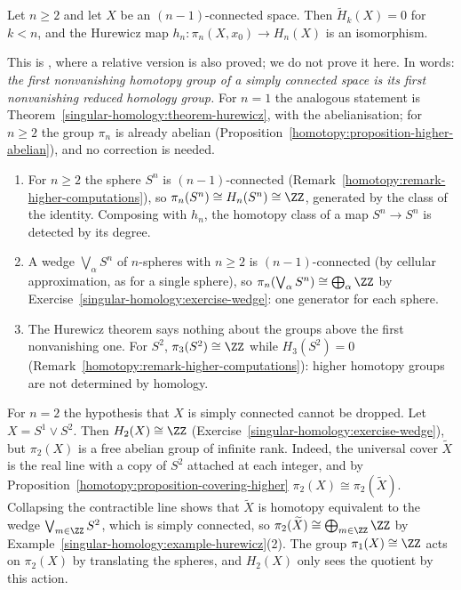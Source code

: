 \begin{theorem}[Hurewicz]\label{singular-homology:theorem-hurewicz-general}
Let $n \geq 2$ and let $X$ be an $(n-1)$-connected space. Then $\tilde{H}_k(X) = 0$ for $k < n$, and the Hurewicz map $h_n \colon \pi_n(X, x_0) \to H_n(X)$ is an isomorphism.
\end{theorem}

This is \cite[Theorem 4.32]{hatcher-at}, where a relative version is also proved; we do not prove it here. In words: \emph{the first nonvanishing homotopy group of a simply connected space
is its first nonvanishing reduced homology group.} For $n = 1$ the analogous statement is Theorem~\ref{singular-homology:theorem-hurewicz}, with the abelianisation; for $n \geq 2$ the group
$\pi_n$ is already abelian (Proposition~\ref{homotopy:proposition-higher-abelian}), and no correction is needed.

\begin{example}\label{singular-homology:example-hurewicz}
\begin{enumerate}
\item For $n \geq 2$ the sphere $S^n$ is $(n-1)$-connected (Remark~\ref{homotopy:remark-higher-computations}), so $\pi_n(S^n) \cong H_n(S^n) \cong \ZZ$, generated by the class of the
identity. Composing with $h_n$, the homotopy class of a map $S^n \to S^n$ is detected by its degree.
\item A wedge $\bigvee_{\alpha}S^n$ of $n$-spheres with $n \geq 2$ is $(n-1)$-connected (by cellular approximation, as for a single sphere), so
$\pi_n(\bigvee_\alpha S^n) \cong \bigoplus_\alpha\ZZ$ by Exercise~\ref{singular-homology:exercise-wedge}: one generator for each sphere.
\item The Hurewicz theorem says nothing about the groups above the first nonvanishing one. For $S^2$, $\pi_3(S^2) \cong \ZZ$ while $H_3(S^2) = 0$
(Remark~\ref{homotopy:remark-higher-computations}): higher homotopy groups are not determined by homology.
\end{enumerate}
\end{example}

\begin{counterexample}\label{singular-homology:counterexample-hurewicz-simply-connected}
For $n = 2$ the hypothesis that $X$ is simply connected cannot be dropped. Let $X = S^1 \vee S^2$. Then $H_2(X) \cong \ZZ$ (Exercise~\ref{singular-homology:exercise-wedge}), but $\pi_2(X)$ is a
free abelian group of infinite rank. Indeed, the universal cover $\widetilde{X}$ is the real line with a copy of $S^2$ attached at each integer, and by
Proposition~\ref{homotopy:proposition-covering-higher} $\pi_2(X) \cong \pi_2(\widetilde{X})$. Collapsing the contractible line shows that $\widetilde{X}$ is homotopy equivalent to the
wedge $\bigvee_{m \in \ZZ}S^2$, which is simply connected, so $\pi_2(\widetilde{X}) \cong \bigoplus_{m \in \ZZ}\ZZ$ by Example~\ref{singular-homology:example-hurewicz}(2). The group
$\pi_1(X) \cong \ZZ$ acts on $\pi_2(X)$ by translating the spheres, and $H_2(X)$ only sees the quotient by this action.
\end{counterexample}

